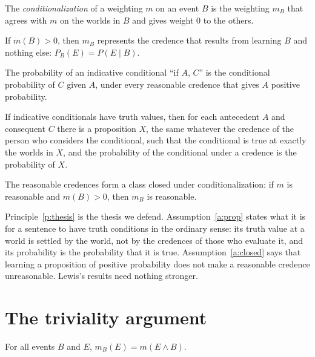 \documentclass{situationist-preprint}
\begin{document}
\begin{definition}\label{d:cond}
The \emph{conditionalization} of a weighting $m$ on an event $B$ is the weighting $m_B$ that agrees with $m$ on the worlds in $B$ and gives weight $0$ to the others.
\end{definition}

If $m(B) > 0$, then $m_B$ represents the credence that results from learning $B$ and nothing else: $P_B(E) = P(E \mid B)$.

\begin{principle}\label{p:thesis}
The probability of an indicative conditional \enquote{if $A$, $C$} is the conditional probability of $C$ given $A$, under every reasonable credence that gives $A$ positive probability.
\end{principle}

\begin{assumption}\label{a:prop}
If indicative conditionals have truth values, then for each antecedent $A$ and consequent $C$ there is a proposition $X$, the same whatever the credence of the person who considers the conditional, such that the conditional is true at exactly the worlds in $X$, and the probability of the conditional under a credence is the probability of $X$.
\end{assumption}

\begin{assumption}[Closure]\label{a:closed}
The reasonable credences form a class closed under conditionalization: if $m$ is reasonable and $m(B) > 0$, then $m_B$ is reasonable.
\end{assumption}

Principle~\ref{p:thesis} is the thesis we defend. Assumption~\ref{a:prop} states what it is for a sentence to have truth conditions in the ordinary sense: its truth value at a world is settled by the world, not by the credences of those who evaluate it, and its probability is the probability that it is true. Assumption~\ref{a:closed} says that learning a proposition of positive probability does not make a reasonable credence unreasonable. Lewis's results need nothing stronger.

\section{The triviality argument}\label{s:triv}

\begin{lemma}\label{l:cond}
For all events $B$ and $E$, $m_B(E) = m(E \wedge B)$.
\end{lemma}
\end{document}
